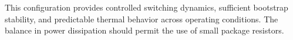 \documentclass[a4paper, 10pt, conference]{IEEEtran} %
\begin{document}
This configuration provides controlled switching dynamics, sufficient bootstrap stability, and predictable thermal behavior across operating conditions. The balance in power dissipation should permit the use of small package resistors.





%
%
%
%
%
\end{document}
